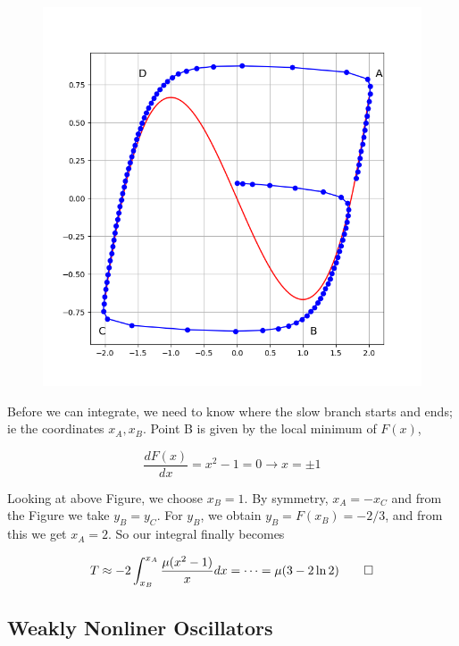 \begin{figure}[H]
    \centering
    \includegraphics[scale=0.75]{images/2024-09-24-vanderpol_1.png}
\end{figure}

Before we can integrate, we need to know where the slow branch starts and ends; ie the coordinates $x_A, x_B$. Point B is given by the local minimum of $F(x)$,

\begin{equation*}
\frac{dF(x)}{dx} = x^2 - 1 = 0 \rightarrow x = \pm 1
\end{equation*}

Looking at above Figure, we choose $x_B = 1$. By symmetry, $x_A = - x_C$ and from the Figure we take $y_B = y_C$. For $y_B$, we obtain $y_B = F(x_B) = -2/3$, and from this we get $x_A = 2$. So our integral finally becomes

\begin{equation*}
T \approx - 2 \int_{x_B}^{x_A} \frac{\mu(x^2-1)}{x} dx = \cdots = \mu (3 - 2 \ln 2) \qed
\end{equation*}

\subsection{Weakly Nonliner Oscillators}

